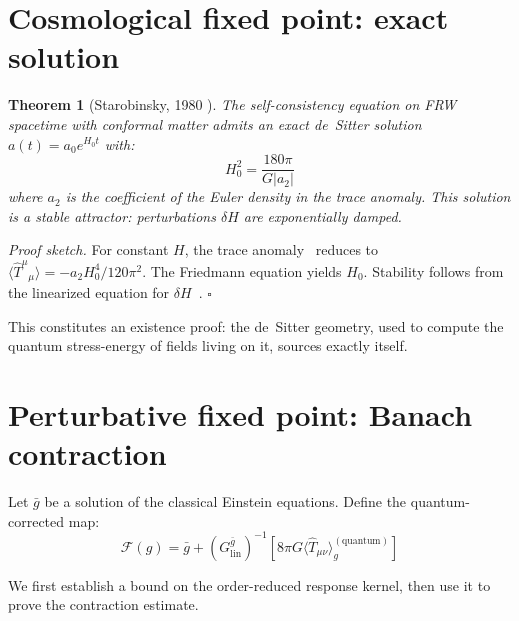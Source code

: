 \documentclass[12pt,a4paper]{article}
\newtheorem{theorem}{Theorem}
\begin{document}
\section{Cosmological fixed point: exact solution}
\label{sec:starobinsky}

\begin{theorem}[Starobinsky, 1980 \cite{starobinsky}]
The self-consistency equation on FRW spacetime with conformal matter admits an exact
de~Sitter solution $a(t) = a_0 e^{H_0 t}$ with:
\begin{equation}
H_0^2 = \frac{180\pi}{G|a_2|}
\end{equation}
where $a_2$ is the coefficient of the Euler density in the trace anomaly. This solution is
a stable attractor: perturbations $\delta H$ are exponentially damped.
\end{theorem}

\noindent\emph{Proof sketch.} For constant $H$, the trace anomaly~\cite{capper_duff}
reduces to $\langle\hat{T}^\mu{}_\mu\rangle = -a_2 H_0^4/120\pi^2$. The Friedmann
equation yields $H_0$. Stability follows from the linearized equation for
$\delta H$~\cite{starobinsky}. \hfill$\square$

This constitutes an existence proof: the de~Sitter geometry, used to compute the quantum
stress-energy of fields living on it, sources exactly itself.

\section{Perturbative fixed point: Banach contraction}
\label{sec:banach}

Let $\bar{g}$ be a solution of the classical Einstein equations. Define the
quantum-corrected map:
\begin{equation}
\mathcal{F}(g) = \bar{g} + (G^{\bar{g}}_{\text{lin}})^{-1}\!\left[8\pi G\langle\hat{T}_{\mu\nu}\rangle^{(\text{quantum})}_g\right]
\end{equation}

\noindent We first establish a bound on the order-reduced response kernel, then use it
to prove the contraction estimate.
\end{document}
